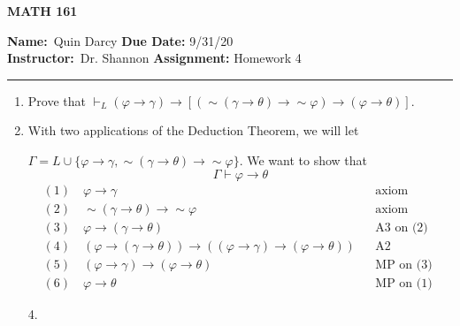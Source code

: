 \documentclass[12pt]{article}
\makeatletter
\theoremstyle{definition}
\theoremstyle{remark}
\renewenvironment{proof}[1][\proofname]{\par
  \pushQED{\qed}%
  \normalfont \topsep6\p@\@plus6\p@\relax
  \list{}{\leftmargin=0mm
          \rightmargin=4mm
          \settowidth{\itemindent}{\itshape#1}%
          \labelwidth=\itemindent
          \parsep=0pt \listparindent=\parindent 
  }
  \item[\hskip\labelsep
        \itshape
    #1\@addpunct{.}]\ignorespaces
}{%
  \popQED\endlist\@endpefalse
}
\let\oldproofname=\proofname
\renewcommand{\proofname}{\bf{\textit{\oldproofname}}}
\makeatother
\begin{document}
\thispagestyle{empty}\hline

\begin{center}
	\vspace{.4cm} {\textbf { \large MATH 161}}
\end{center}
{\textbf{Name:}\ Quin Darcy \hspace{\fill} \textbf{Due Date:} 9/31/20   \\
{ \textbf{Instructor:}}\ Dr. Shannon \hspace{\fill} \textbf{Assignment:} Homework 4 \\ \hrule}

\justifying
    \begin{enumerate}[leftmargin=*]
        \item Prove that $\vdash_L(\varphi\rightarrow\gamma)\rightarrow[(\sim(\gamma\rightarrow\theta)\rightarrow\sim\varphi)\rightarrow(\varphi\rightarrow\theta)]$.
            \begin{proof}
                With two applications of the Deduction Theorem, we will let\par $\Gamma=L\cup\{\varphi\rightarrow\gamma, \sim(\gamma\rightarrow\theta)\rightarrow\sim\varphi\}$. We want to show that
                    \begin{equation*}
                        \Gamma\vdash\varphi\rightarrow\theta
                    \end{equation*}
                    \begin{align*}
                        &(1) \quad\varphi\rightarrow\gamma &&\text{axiom} \\
                        &(2) \quad\sim(\gamma\rightarrow\theta)\rightarrow\sim\varphi &&\text{axiom} \\
                        &(3) \quad\varphi\rightarrow(\gamma\rightarrow\theta) &&\text{A3 on (2)} \\
                        &(4) \quad(\varphi\rightarrow(\gamma\rightarrow\theta))\rightarrow((\varphi\rightarrow\gamma)\rightarrow(\varphi\rightarrow\theta)) &&\text{A2} \\
                        &(5) \quad(\varphi\rightarrow\gamma)\rightarrow(\varphi\rightarrow\theta) &&\text{MP on (3) and (4)} \\
                        &(6) \quad\varphi\rightarrow\theta &&\text{MP on (1) and (5)}
                    \end{align*}
            \end{proof}
        \item[4.]\par\hfill

\end{enumerate}
\end{document}
